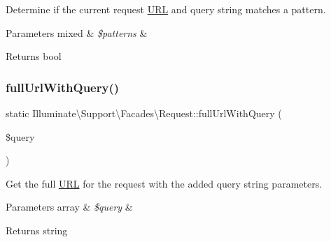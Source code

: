 Determine if the current request \mbox{\hyperlink{class_illuminate_1_1_support_1_1_facades_1_1_u_r_l}{U\+RL}} and query string matches a pattern.


\begin{DoxyParams}[1]{Parameters}
mixed & {\em \$patterns} & \\
\hline
\end{DoxyParams}
\begin{DoxyReturn}{Returns}
bool 
\end{DoxyReturn}
\mbox{\label{class_illuminate_1_1_support_1_1_facades_1_1_request_a078d7acddf08cbc6d1b71efcdbebcde6}} 
\subsubsection{\texorpdfstring{full\+Url\+With\+Query()}{fullUrlWithQuery()}}
{\footnotesize\ttfamily static Illuminate\textbackslash{}\+Support\textbackslash{}\+Facades\textbackslash{}\+Request\+::full\+Url\+With\+Query (\begin{DoxyParamCaption}\item[{}]{\$query }\end{DoxyParamCaption})\hspace{0.3cm}{\ttfamily [static]}}

Get the full \mbox{\hyperlink{class_illuminate_1_1_support_1_1_facades_1_1_u_r_l}{U\+RL}} for the request with the added query string parameters.


\begin{DoxyParams}[1]{Parameters}
array & {\em \$query} & \\
\hline
\end{DoxyParams}
\begin{DoxyReturn}{Returns}
string 
\end{DoxyReturn}
\mbox{\label{class_illuminate_1_1_support_1_1_facades_1_1_request_af1519e8f3d8baaa19829f3f4a53c9b41}} 
